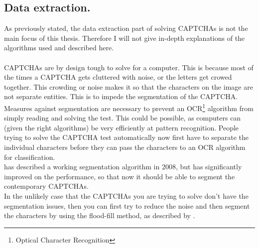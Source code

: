 \documentclass[pdftex,a4paper,12pt,twoside]{report}
\begin{document}
\subsection{Data extraction.}
As previously stated, the data extraction part of solving CAPTCHAs is not the main focus of this thesis. Therefore I will not give in-depth explanations of the algorithms used and described here.\\\\CAPTCHAs are by design tough to solve for a computer. This is because most of the times a CAPTCHA gets cluttered with noise, or the letters get crowed together. This crowding or noise makes it so that the characters on the image are not separate entities.    This is to impede the segmentation of the CAPTCHA. Measures against segmentation are necessary to prevent an OCR\footnote{Optical Character Recognition} algorithm from simply reading and solving the test. This could be possible, as computers can (given the right algorithms) be very efficiently at pattern recognition. People trying to solve the CAPTCHA test automatically now first have to separate the individual characters before they can pass the characters to an OCR algorithm for classification.\\\citep{Yan2008} has described a working segmentation algorithm in 2008, but \citep{Huang2010} has significantly improved on the performance, so that now it should be able to segment the contemporary CAPTCHAs.\\In the unlikely case that the CAPTCHAs you are trying to solve don't have the segmentation issues, then you can first try to reduce the noise and then segment the characters by using the flood-fill method, as described by \citep{Cai2008}.
\end{document}
